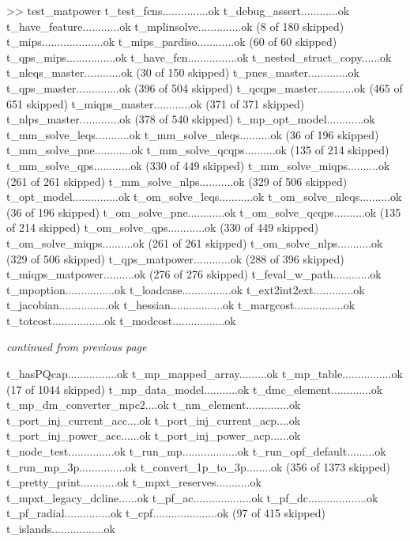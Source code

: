 \documentclass[12pt]{article}
\numberwithin{equation}{section}
\numberwithin{table}{section}
\numberwithin{figure}{section}
\begin{document}
\begin{enumerate}
\begin{Code}
>> test_matpower
t_test_fcns...............ok
t_debug_assert............ok
t_have_feature............ok
t_mplinsolve..............ok (8 of 180 skipped)
t_mips....................ok
t_mips_pardiso............ok (60 of 60 skipped)
t_qps_mips................ok
t_have_fcn................ok
t_nested_struct_copy......ok
t_nleqs_master............ok (30 of 150 skipped)
t_pnes_master.............ok
t_qps_master..............ok (396 of 504 skipped)
t_qcqps_master............ok (465 of 651 skipped)
t_miqps_master............ok (371 of 371 skipped)
t_nlps_master.............ok (378 of 540 skipped)
t_mp_opt_model............ok
t_mm_solve_leqs...........ok
t_mm_solve_nleqs..........ok (36 of 196 skipped)
t_mm_solve_pne............ok
t_mm_solve_qcqps..........ok (135 of 214 skipped)
t_mm_solve_qps............ok (330 of 449 skipped)
t_mm_solve_miqps..........ok (261 of 261 skipped)
t_mm_solve_nlps...........ok (329 of 506 skipped)
t_opt_model...............ok
t_om_solve_leqs...........ok
t_om_solve_nleqs..........ok (36 of 196 skipped)
t_om_solve_pne............ok
t_om_solve_qcqps..........ok (135 of 214 skipped)
t_om_solve_qps............ok (330 of 449 skipped)
t_om_solve_miqps..........ok (261 of 261 skipped)
t_om_solve_nlps...........ok (329 of 506 skipped)
t_qps_matpower............ok (288 of 396 skipped)
t_miqps_matpower..........ok (276 of 276 skipped)
t_feval_w_path............ok
t_mpoption................ok
t_loadcase................ok
t_ext2int2ext.............ok
t_jacobian................ok
t_hessian.................ok
t_margcost................ok
t_totcost.................ok
t_modcost.................ok
\end{Code}
\pagebreak
\emph{continued from previous page}
\begin{Code}
t_hasPQcap................ok
t_mp_mapped_array.........ok
t_mp_table................ok (17 of 1044 skipped)
t_mp_data_model...........ok
t_dmc_element.............ok
t_mp_dm_converter_mpc2....ok
t_nm_element..............ok
t_port_inj_current_acc....ok
t_port_inj_current_acp....ok
t_port_inj_power_acc......ok
t_port_inj_power_acp......ok
t_node_test...............ok
t_run_mp..................ok
t_run_opf_default.........ok
t_run_mp_3p...............ok
t_convert_1p_to_3p........ok (356 of 1373 skipped)
t_pretty_print............ok
t_mpxt_reserves...........ok
t_mpxt_legacy_dcline......ok
t_pf_ac...................ok
t_pf_dc...................ok
t_pf_radial...............ok
t_cpf.....................ok (97 of 415 skipped)
t_islands.................ok

\end{Code}
\end{enumerate}
\end{document}
